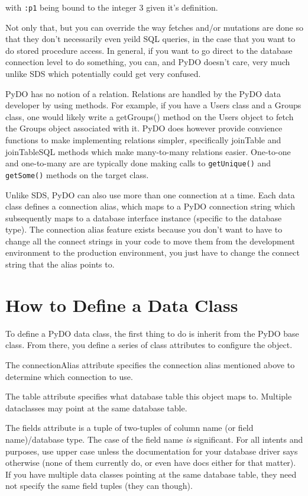 \documentclass[titlepage]{manual}
\begin{document}
with \texttt{:p1} being bound to the integer 3 given it's definition.

Not only that, but you can override the way fetches and/or mutations
are done so that they don't necessarily even yeild SQL queries, in the
case that you want to do stored procedure access.  In general,
if you want to go direct to the database connection level to do
something, you can, and PyDO doesn't care, very much unlike SDS which
potentially could get very confused.

PyDO has no notion of a relation.  Relations are handled by the PyDO
data developer by using methods.  For example, if you have a Users
class and a Groups class, one would likely write a getGroups() method
on the Users object to fetch the Groups object associated with it.
PyDO does however provide convience functions to make implementing
relations simpler, specifically joinTable and joinTableSQL methods
which make many-to-many relations easier.  One-to-one and one-to-many
are are typically done making calls to \texttt{getUnique()} and
\texttt{getSome()} methods on the target class.

Unlike SDS, PyDO can also use more than one connection at a time.
Each data class defines a connection alias, which maps to a PyDO
connection string which subsequently maps to a database interface
instance (specific to the database type).  The connection alias
feature exists because you don't want to have to change all the
connect strings in your code to move them from the development
environment to the production environment, you just have to change the
connect string that the alias points to.


\chapter{How to Define a Data Class}
To define a PyDO data class, the first thing to do is inherit from the
PyDO base class.  From there, you define a series of class attributes
to configure the object.  

The connectionAlias attribute specifies the connection alias mentioned
above to determine which connection to use.

The table attribute specifies what database table this object maps
to.  Multiple dataclasses may point at the same database table.

The fields attribute is a tuple of two-tuples of column name (or field
name)/database type.  The case of the field name \emph{is} significant.
For all intents and purposes, use upper case unless the documentation
for your database driver says otherwise (none of them currently do, or
even have docs either for that matter).  If you have multiple data
classes pointing at the same database table, they need not specify the
same field tuples (they can though).
\end{document}
